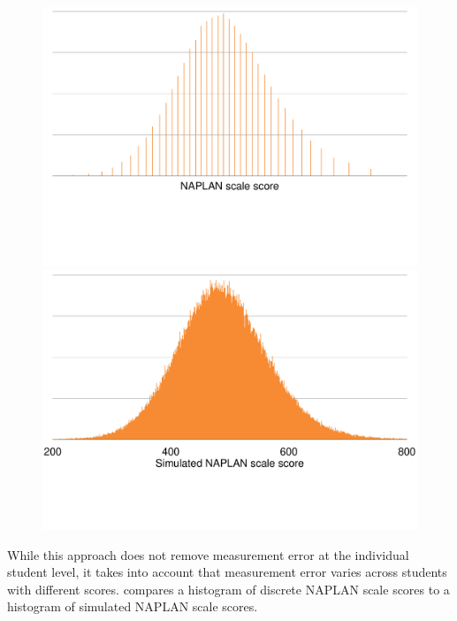 \begin{figure}[H]
 \includegraphics[width=\columnwidth]{atlas/Hist_NSS.pdf}\label{fig:histogram}
  \includegraphics[width=\columnwidth]{atlas/Hist_SIM.pdf}

\end{figure}
\newpage
While this approach does not remove measurement error at the individual student level, it takes into account that measurement error varies across students with different scores.  compares a histogram of discrete NAPLAN scale scores to a histogram of simulated NAPLAN scale scores.

